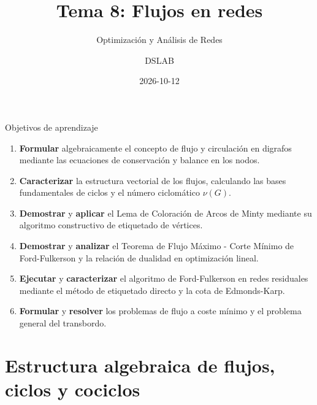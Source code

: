 \documentclass[
  ignorenonframetext,
]{beamer}
\title{Tema 8: Flujos en redes}
\subtitle{Optimización y Análisis de Redes}
\author{DSLAB}
\date{2026-10-12}
\providecommand{\tightlist}{%
  \setlength{\itemsep}{0pt}\setlength{\parskip}{0pt}}
\begin{document}
\frame{\titlepage}


\begin{frame}{Objetivos de aprendizaje}
\label{objetivos-de-aprendizaje}
\begin{enumerate}
\tightlist
\item
  \textbf{Formular} algebraicamente el concepto de flujo y circulación
  en digrafos mediante las ecuaciones de conservación y balance en los
  nodos.
\item
  \textbf{Caracterizar} la estructura vectorial de los flujos,
  calculando las bases fundamentales de ciclos y el número ciclomático
  \(\nu(G)\).
\item
  \textbf{Demostrar} y \textbf{aplicar} el Lema de Coloración de Arcos
  de Minty mediante su algoritmo constructivo de etiquetado de vértices.
\item
  \textbf{Demostrar} y \textbf{analizar} el Teorema de Flujo Máximo -
  Corte Mínimo de Ford-Fulkerson y la relación de dualidad en
  optimización lineal.
\item
  \textbf{Ejecutar} y \textbf{caracterizar} el algoritmo de
  Ford-Fulkerson en redes residuales mediante el método de etiquetado
  directo y la cota de Edmonds-Karp.
\item
  \textbf{Formular} y \textbf{resolver} los problemas de flujo a coste
  mínimo y el problema general del transbordo.
\end{enumerate}
\end{frame}

\section{Estructura algebraica de flujos, ciclos y
cociclos}\label{estructura-algebraica-de-flujos-ciclos-y-cociclos}
\end{document}
